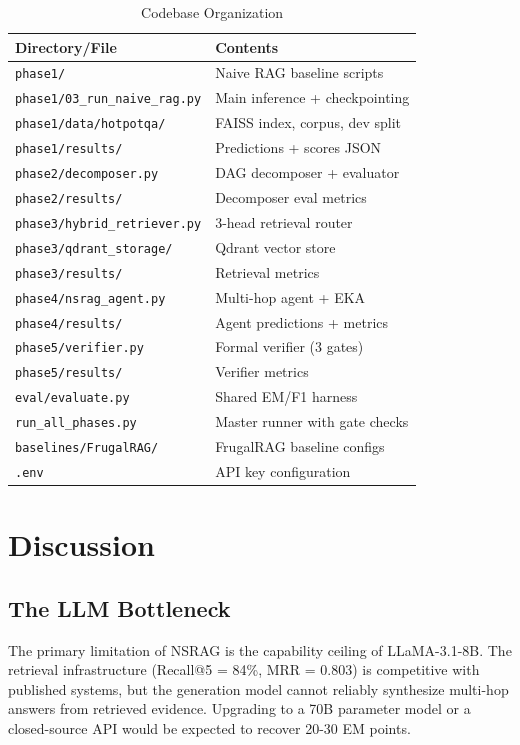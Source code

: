 \documentclass[conference]{IEEEtran}
\begin{document}
\begin{table}[h]
\centering
\caption{Codebase Organization}
\label{tab:repo}
\begin{tabular}{ll}
\toprule
\textbf{Directory/File} & \textbf{Contents} \\
\midrule
\texttt{phase1/} & Naive RAG baseline scripts \\
\texttt{phase1/03\_run\_naive\_rag.py} & Main inference + checkpointing \\
\texttt{phase1/data/hotpotqa/} & FAISS index, corpus, dev split \\
\texttt{phase1/results/} & Predictions + scores JSON \\
\midrule
\texttt{phase2/decomposer.py} & DAG decomposer + evaluator \\
\texttt{phase2/results/} & Decomposer eval metrics \\
\midrule
\texttt{phase3/hybrid\_retriever.py} & 3-head retrieval router \\
\texttt{phase3/qdrant\_storage/} & Qdrant vector store \\
\texttt{phase3/results/} & Retrieval metrics \\
\midrule
\texttt{phase4/nsrag\_agent.py} & Multi-hop agent + EKA \\
\texttt{phase4/results/} & Agent predictions + metrics \\
\midrule
\texttt{phase5/verifier.py} & Formal verifier (3 gates) \\
\texttt{phase5/results/} & Verifier metrics \\
\midrule
\texttt{eval/evaluate.py} & Shared EM/F1 harness \\
\texttt{run\_all\_phases.py} & Master runner with gate checks \\
\texttt{baselines/FrugalRAG/} & FrugalRAG baseline configs \\
\texttt{.env} & API key configuration \\
\bottomrule
\end{tabular}
\end{table}

\section{Discussion}

\subsection{The LLM Bottleneck}
The primary limitation of NSRAG is the capability ceiling of LLaMA-3.1-8B. The retrieval infrastructure (Recall@5 = 84\%, MRR = 0.803) is competitive with published systems, but the generation model cannot reliably synthesize multi-hop answers from retrieved evidence. Upgrading to a 70B parameter model or a closed-source API would be expected to recover 20-30 EM points.
\end{document}
